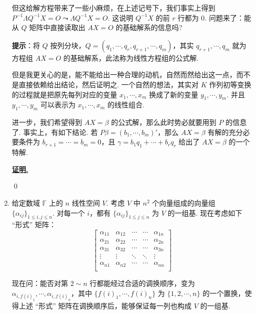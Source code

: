 \documentclass{ctexart}
\renewenvironment{proof}[1][证明]{\par\underline{\textbf{#1.}} \;\fangsong}{\qed\par}
\begin{document}
\begin{enumerate}[1.]
但这给解方程带来了一些小麻烦，在上述记号下，我们事实上得到 \( P^{-1}\Lambda Q^{-1}X=O \leadsto \Lambda Q^{-1}X=O \). 这说明 \( Q^{-1}X \) 的前 \( r \) 行都为 0. 问题来了：能从 \( Q \) 矩阵中直接读取出 \( AX=O \) 的基础解系的信息吗? 

\textbf{提示}：将 \( Q \) 按列分块，\( Q=(q_1,\cdots,q_r,q_{r+1},\cdots,q_m) \)，其实 \( q_{r+1},\cdots,q_m \) 就为方程组 \( AX=O \) 的基础解系，此法称为线性方程组的公式解. 

但是我更关心的是，能不能给出一种合理的动机，自然而然给出这一点，而不是直接依赖给出结论，然后证明之. 一个自然的想法，其实对 \( K \) 作列初等变换的过程就是把原先每列对应的变量 \( x_1,\cdots,x_m \) 换成了新的变量 \( y_1,\cdots,y_m \). 并且 \( y_1,\cdots,y_m \) 可以表示为 \( x_1,\cdots,x_m \) 的线性组合.

进一步，我们希望得到 \( AX=\beta \) 的公式解，那么此时势必就要用到 \( P \) 的信息了. 事实上，有如下结论. 若 \( P\beta=(b_1,\cdots,b_m)' \)，那么 \( AX=\beta \) 有解的充分必要条件为 \( b_{r+1}=\cdots=b_m=0 \)，且 \( \gamma=b_1q_1+\cdots+b_rq_r \) 给出了 \( AX=\beta \) 的一个特解. 



\begin{proof}
	
\end{proof}

\newpage

\item 给定数域 \( \mathbb{F} \) 上的 \( n \) 线性空间 \( V \). 考虑 \( V \) 中 \( n^2 \) 个向量组成的向量组 \( \{\alpha_{ij}\}_{1 \leq i,j \leq n} \). 对每一个 \( i \)，都有 \( \{\alpha_{ij}\}_{1 \leq j \leq n} \) 为 \( V \) 的一组基. 现在考虑如下 “形式” 矩阵：
\[ \begin{bmatrix}
	\alpha_{11} & \alpha_{12} & \cdots & \cdots & \alpha_{1n} \\
	\alpha_{21} & \alpha_{22} & \cdots & \cdots & \alpha_{2n} \\
	\alpha_{31} & \alpha_{32} & \cdots & \cdots & \alpha_{3n} \\
	\vdots & \vdots & \ddots & \ddots & \vdots \\
	\alpha_{n1} & \alpha_{n2} & \cdots & \cdots & \alpha_{nn} \\
\end{bmatrix}
\]

现在问：能否对第 \( 2 \sim n \) 行都能经过合适的调换顺序，变为 \( \alpha_{i,f(i)_1},\cdots,\alpha_{i,f(i)_n} \)，其中 \( \{f(i)_1,\cdots,f(i)_n\} \) 为 \( \{1,2,\cdots,n \} \) 的一个置换，使得上述 “形式” 矩阵在调换顺序后，能够保证每一列也构成 \( V \) 的一组基. 


\end{enumerate}
\end{document}
